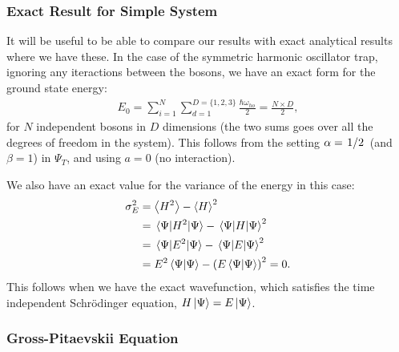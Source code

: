 \documentclass[twocolumn]{article}
\begin{document}
\subsubsection{Exact Result for Simple System}

It will be useful to be able to compare our results with exact analytical
results where we have these. In the case of the symmetric harmonic oscillator
trap, ignoring any iteractions between the bosons, we have an exact form for the
ground state energy:
\begin{align}
    E_0 = \sum_{i=1}^N\sum_{d=1}^{D=\{1,2,3\}} \frac{\hbar \omega_{ho}}{2} 
    = \frac{N\times D}{2},\label{eq:exact-ground-state}
\end{align}
for $N$ independent bosons in $D$ dimensions (the two sums goes
over all the degrees of freedom in the system). This follows from the setting
$\alpha=\flatfrac{1}{2}$ (and $\beta=1$) in $\Psi_T$, and using $a=0$ (no
interaction). 

We also have an exact value for the variance of the energy in this case:
\begin{align}
    \begin{split}
        \sigma_E^2 &= \expval{H^2} - \expval{H}^2\\
            &= \expval{H^2}{\Psi}-\expval{H}{\Psi}^2\\
            &= \expval{E^2}{\Psi}-\expval{E}{\Psi}^2\\
            &= E^2\braket{\Psi} - \qty(E\braket{\Psi})^2= 0.
    \end{split}\label{eq:var-zero-when-exact}
\end{align}
This follows when we have the exact wavefunction, which satisfies the time
independent Schrödinger equation, $H\ket{\Psi}=E\ket{\Psi}$.


\subsubsection{Gross-Pitaevskii Equation}
\end{document}
